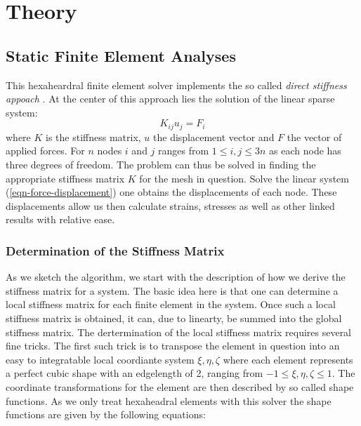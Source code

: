 \chapter{Theory}

\section{Static Finite Element Analyses}

This hexaheardral finite element solver implements the so called \emph{direct
  stiffness appoach}
\cite{bathe}. At the center of this approach lies the solution of the
linear sparse system:
\begin{equation}
  K_{ij} u_j = F_i
  \label{eqn-force-displacement}
\end{equation}
where $K$ is the stiffness matrix, $u$ the displacement vector and $F$
the vector of applied forces. For $n$ nodes $i$ and $j$ ranges from
$1 \le i,j \le 3n$  as each
node has three degrees of freedom.
The problem can thus be solved in finding the
appropriate stiffness matrix $K$ for the mesh in question. 
Solve the linear system (\ref{eqn-force-displacement}) one obtains the
displacements of each node. These displacements allow us then
calculate strains, stresses as well as other linked results with relative
ease.

\subsection{Determination of the Stiffness Matrix}

As we sketch the algorithm, we start with the description of how we derive
the stiffness matrix for a system. The basic idea here is that one can
determine a local stiffness matrix for each finite element in the
system. Once such a local stiffness matrix is obtained, it can, due to
linearty, be summed into the global stiffness matrix.
The dertermination of the local stiffness matrix 
requires several fine tricks. The first such trick is to transpose the element
in question into an easy to integratable local coordiante system ${\xi,
\eta,\zeta}$ where each element represents a perfect cubic shape with
an edgelength of 2, ranging from $-1 \le \xi,\eta,\zeta \le 1$. The
coordinate transformations for the element are then described by so
called shape functions. As we only treat hexaheadral elements with
this solver the shape functions are given by the following equations:

